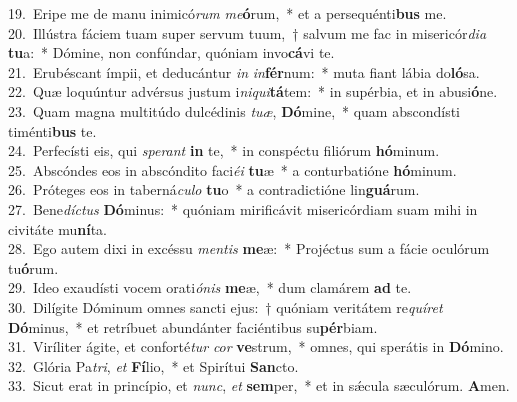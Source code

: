 {19.~}Eripe me de manu inimicó\textit{rum} \textit{me}\textbf{ó}rum,~* et a persequénti\textbf{bus} me.\\
{20.~}Illústra fáciem tuam super servum tuum,~† salvum me fac in misericór\textit{di}\textit{a} \textbf{tu}a:~* Dómine, non confúndar, quóniam invo\textbf{cá}vi te.\\
{21.~}Erubéscant ímpii, et deducántur \textit{in} \textit{in}\textbf{fér}num:~* muta fiant lábia do\textbf{ló}sa.\\
{22.~}Quæ loquúntur advérsus justum i\textit{ni}\textit{qui}\textbf{tá}tem:~* in supérbia, et in abusi\textbf{ó}ne.\\
{23.~}Quam magna multitúdo dulcédinis \textit{tu}\textit{æ}, \textbf{Dó}mine,~* quam abscondísti timénti\textbf{bus} te.\\
{24.~}Perfecísti eis, qui \textit{spe}\textit{rant} \textbf{in} te,~* in conspéctu filiórum \textbf{hó}minum.\\
{25.~}Abscóndes eos in abscóndito faci\textit{é}\textit{i} \textbf{tu}æ~* a conturbatióne \textbf{hó}minum.\\
{26.~}Próteges eos in taberná\textit{cu}\textit{lo} \textbf{tu}o~* a contradictióne lin\textbf{guá}rum.\\
{27.~}Bene\textit{dí}\textit{ctus} \textbf{Dó}minus:~* quóniam mirificávit misericórdiam suam mihi in civitáte mu\textbf{ní}ta.\\
{28.~}Ego autem dixi in excéssu \textit{men}\textit{tis} \textbf{me}æ:~* Projéctus sum a fácie oculórum tu\textbf{ó}rum.\\
{29.~}Ideo exaudísti vocem orati\textit{ó}\textit{nis} \textbf{me}æ,~* dum clamárem \textbf{ad} te.\\
{30.~}Dilígite Dóminum omnes sancti ejus:~† quóniam veritátem re\textit{quí}\textit{ret} \textbf{Dó}minus,~* et retríbuet abundánter faciéntibus su\textbf{pér}biam.\\
{31.~}Viríliter ágite, et conforté\textit{tur} \textit{cor} \textbf{ve}strum,~* omnes, qui sperátis in \textbf{Dó}mino.\\
{32.~}Glória Pa\textit{tri}, \textit{et} \textbf{Fí}lio,~* et Spirítui \textbf{San}cto.\\
{33.~}Sicut erat in princípio, et \textit{nunc}, \textit{et} \textbf{sem}per,~* et in sǽcula sæculórum. \textbf{A}men.\\
